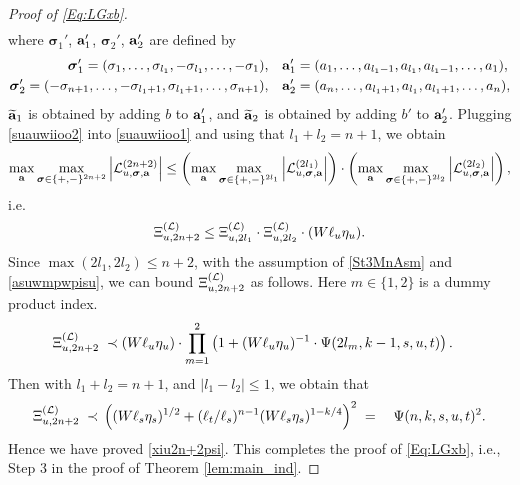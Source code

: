 \documentclass[10pt,reqno]{article}
\newcommand{\wt}{\widetilde}
\newcommand{\ba}{{\bf{a}}}
\theoremstyle{plain} %
\theoremstyle{remark}
\numberwithin{equation}{section}
\begin{document}
\begin{proof}[Proof of \eqref{Eq:LGxb}]
\begin{align}
\end{align}
where $\boldsymbol{\sigma}_1'$, $\ba_1'$, $\boldsymbol{\sigma}_2'$, $\ba_2'$ are defined by  
\begin{align*}
\boldsymbol{\sigma}_1'=(\sigma_1,\ldots,\sigma_{l_1},-\sigma_{l_1},\ldots,-\sigma_1),\quad  &\ba_1'=( a_1 ,\ldots,  a_{l_1-1} , a_{l_1} , a_{l_1-1} ,\ldots,  a_1 ),\\
\boldsymbol{\sigma}_2'=(-\sigma_{n+1},\ldots,-\sigma_{l_1+1},\sigma_{l_1+1},\ldots,\sigma_{n+1}),\quad &\ba_2'=( a_{n} ,\ldots,  a_{l_1+1} , a_{l_1} , a_{l_1+1} ,\ldots,  a_{n} ),
\end{align*}
$\wt\ba_1$ is obtained by adding $b$ to $\ba_1'$, and $\wt\ba_2$ is obtained by adding $b'$ to $\ba_2'$. Plugging \eqref{suauwiioo2} into \eqref{suauwiioo1} and using that $l_1+l_2=n+1$, we obtain
\begin{align} \label{asu-2w}
   \max_{\ba }\max_{\boldsymbol{\sigma}\in \{+,-\}^{2n+2}}\left|{\cal L}^{(2n+2)}_{u,\boldsymbol{\sigma},\ba}\right|\le 
    \left(\max_{\ba }\max_{\boldsymbol{\sigma}\in \{+,-\}^{2l_1}}\left|{\cal L}^{(2l_1)}_{u,\boldsymbol{\sigma},\ba}\right|\right)\cdot \left(\max_{\ba }\max_{\boldsymbol{\sigma}\in \{+,-\}^{2l_2}}\left|{\cal L}^{(2l_2)}_{u,\boldsymbol{\sigma},\ba}\right|\right), 
\end{align}
i.e.
\begin{align} \label{asuwmpwpisu}
\Xi^{({\cal L})}_{u, 2n+2}\le \Xi^{({\cal L})}_{u, 2l_1}\cdot \Xi^{({\cal L})}_{u, 2l_2}\cdot (W\ell_u\eta_u).
\end{align}  
Since   $\max(2l_1, 2l_2)\le n+2$, with the assumption of \eqref{St3MnAsm} and \eqref{asuwmpwpisu}, we can bound $\Xi^{({\cal L})}_{u, 2n+2}$ as follows. Here \(m\in\{1,2\}\) is a dummy product index.
\begin{align}
 \Xi^{({\cal L})}_{u, 2n+2}
\; \prec \; &(W\ell_u\eta_u)\cdot \prod_{m=1}^2\left(1+(W\ell_u\eta_u)^{-1}\cdot \Psi(2l_m, k-1, s,u,t)\right) . 
 \end{align} 
 Then with $l_1+l_2=n+1$, and $|l_1-l_2|\le 1$,  we obtain  that
 \begin{align}
\Xi^{({\cal L})}_{u, 2n+2}\; \prec \; &\left((W\ell_s\eta_s)^{1/2}+(\ell_t/\ell_s)^{n-1}(W\ell_s\eta_s)^{1-k/4}\right)^2
\; = \; &\Psi(n,k,s,u,t)^2.
 \end{align} 
Hence we have proved  \eqref{xiu2n+2psi}. This completes the proof of \eqref{Eq:LGxb}, i.e., Step 3 in the proof of Theorem \ref{lem:main_ind}. 


\end{proof}
\end{document}
